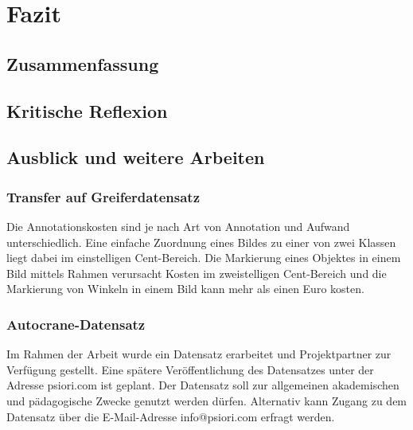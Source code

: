 \chapter{Fazit}
\label{chap:Fazit}

	\section{Zusammenfassung}
	\label{sec:Zusammenfassung}
			
	\section{Kritische Reflexion}
	\label{sec:KritischeReflexion}
				
	\section{Ausblick und weitere Arbeiten}
	\label{sec:AusblickWeitereArbeiten}


	\subsection{Transfer auf Greiferdatensatz}
	\label{subsec:TransferGreiferDatensatz}
 	Die Annotationskosten sind je nach Art von Annotation und Aufwand unterschiedlich. Eine einfache Zuordnung eines Bildes zu einer von zwei Klassen liegt dabei im einstelligen Cent-Bereich. Die Markierung eines Objektes in einem Bild mittels Rahmen verursacht Kosten im zweistelligen Cent-Bereich und die Markierung von Winkeln in einem Bild kann mehr als einen Euro kosten. 		

	
	\subsection{Autocrane-Datensatz}
	\label{subsec:AutocraneDatensatz}	
	Im Rahmen der Arbeit wurde ein Datensatz erarbeitet und Projektpartner zur Verfügung gestellt. Eine spätere Veröffentlichung des Datensatzes unter der Adresse psiori.com ist geplant. Der Datensatz soll zur allgemeinen akademischen und pädagogische Zwecke genutzt werden dürfen. Alternativ kann Zugang zu dem Datensatz über die E-Mail-Adresse info@psiori.com erfragt werden.

